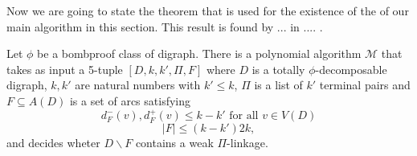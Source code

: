 Now we are going to state the theorem that is used for the existence of the of our main algorithm in this section. 
This result is found by ... in .... .
\begin{thm}
    Let $\phi$ be a bombproof class of digraph. There is a polynomial algorithm $\mathcal{M}$ that takes as input a 5-tuple $[D,k,k',\Pi,F]$ where $D$ is a totally $\phi$-decomposable digraph, $k,k'$ are natural numbers with $k'\leq k$, $\Pi$ is a list of $k'$ terminal pairs and $F\subseteq A(D)$ is a set of arcs satisfying 
    \begin{equation}
        d_F^-(v),d_F^+(v)\leq k-k' \text{ for all } v\in V(D)
    \end{equation}
    \begin{equation*}
        |F|\leq (k-k')2k,
    \end{equation*}
    and decides wheter $D\backslash F$ contains a weak $\Pi$-linkage.
    \label{thm:mainalgo}
\end{thm}
   
